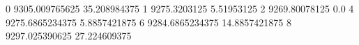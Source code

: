 0 9305.009765625 35.208984375
1 9275.3203125 5.51953125
2 9269.80078125 0.0
4 9275.6865234375 5.8857421875
6 9284.6865234375 14.8857421875
8 9297.025390625 27.224609375
